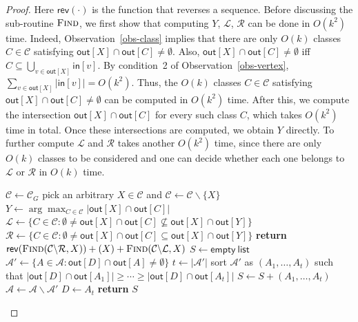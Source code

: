 \documentclass[english]{lipics-v2021}
\begin{document}
\begin{proof}
Here $\mathsf{rev}(\cdot)$ is the function that reverses a sequence.
Before discussing the sub-routine $\textsc{Find}$, we first show that computing $Y$, $\mathcal{L}$, $\mathcal{R}$ can be done in $O(k^2)$ time.
Indeed, Observation~\ref{obs-class} implies that there are only $O(k)$ classes $C \in \mathcal{C}$ satisfying $\mathsf{out}[X] \cap \mathsf{out}[C] \neq \emptyset$.
Also, $\mathsf{out}[X] \cap \mathsf{out}[C] \neq \emptyset$ iff $C \subseteq \bigcup_{v \in \mathsf{out}[X]} \mathsf{in}[v]$.
By condition~2 of Observation~\ref{obs-vertex}, $\sum_{v \in \mathsf{out}[X]} |\mathsf{in}[v]| = O(k^2)$.
Thus, the $O(k)$ classes $C \in \mathcal{C}$ satisfying $\mathsf{out}[X] \cap \mathsf{out}[C] \neq \emptyset$ can be computed in $O(k^2)$ time.
After this, we compute the intersection $\mathsf{out}[X] \cap \mathsf{out}[C]$ for every such class $C$, which takes $O(k^2)$ time in total.
Once these intersections are computed, we obtain $Y$ directly.
To further compute $\mathcal{L}$ and $\mathcal{R}$ takes another $O(k^2)$ time, since there are only $O(k)$ classes to be considered and one can decide whether each one belongs to $\mathcal{L}$ or $\mathcal{R}$ in $O(k)$ time.

\begin{algorithm}
    \caption{\textsc{ClassOrder}$(G,\mathcal{C}_G)$}
    \begin{algorithmic}[1]
        \State $\mathcal{C} \leftarrow \mathcal{C}_G$
        \State pick an arbitrary $X \in \mathcal{C}$ and $\mathcal{C} \leftarrow \mathcal{C} \backslash \{X\}$
        \State $Y \leftarrow \arg\max_{C \in \mathcal{C}} |\mathsf{out}[X] \cap \mathsf{out}[C]|$
        \State $\mathcal{L} \leftarrow \{C \in \mathcal{C}: \emptyset \neq \mathsf{out}[X] \cap \mathsf{out}[C] \nsubseteq \mathsf{out}[X] \cap \mathsf{out}[Y]\}$
        \State $\mathcal{R} \leftarrow \{C \in \mathcal{C}: \emptyset \neq \mathsf{out}[X] \cap \mathsf{out}[C] \subseteq \mathsf{out}[X] \cap \mathsf{out}[Y]\}$       
        \State \textbf{return} $\mathsf{rev}(\textsc{Find}(\mathcal{C} \backslash \mathcal{R},X))+(X)+\textsc{Find}(\mathcal{C} \backslash \mathcal{L},X)$
        \medskip
            \State $S \leftarrow \mathsf{empty\ list}$
                \State $\mathcal{A}' \leftarrow \{A \in \mathcal{A}: \mathsf{out}[D] \cap \mathsf{out}[A] \neq \emptyset\}$
                \State $t \leftarrow |\mathcal{A}'|$
                \EndIf                
                \State sort $\mathcal{A}'$ as $(A_1,\dots,A_t)$ such that $|\mathsf{out}[D] \cap \mathsf{out}[A_1]| \geq \cdots \geq |\mathsf{out}[D] \cap \mathsf{out}[A_t]|$
                \State $S \leftarrow S + (A_1,\dots,A_t)$
                \State $\mathcal{A} \leftarrow \mathcal{A} \backslash \mathcal{A}'$
                \State $D \leftarrow A_t$
            \EndWhile
            \State \textbf{return} $S$
        \EndFunction
    \end{algorithmic}
    \label{alg-classorder}
\end{algorithm}


\end{proof}
\end{document}
